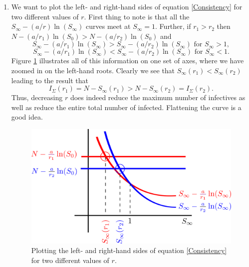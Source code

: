 \documentclass[10pt]{article}
\newcommand{\bb}{\begin{equation}}
\newcommand{\ee}{\end{equation}}
\newcommand{\fig}[1]{Figure \ref{#1}}
\newcommand{\eqn}[1]{equation \eqref{#1}}
\newcommand{\tp}{.8\textwidth}
\renewcommand{\l}{\left(}
\renewcommand{\r}{\right)}
\begin{document}
\begin{Answ}
\begin{enumerate}
\item We want to plot the left- and right-hand sides of \eqn{Consistency} for two different values of $r$. First thing to note is that all the $S_\infty-\l a/r\r\ln(S_\infty)$ curves meet at $S_\infty=1$. Further, if $r_1>r_2$ then $N-(a/r_1)\ln(S_0)>N-(a/r_2)\ln(S_0)$ and 
\bb
S_\infty-\l a/r_1\r\ln(S_\infty)>S_\infty-\l a/r_2\r\ln(S_\infty) \textrm{ for } S_\infty>1,
\ee
\bb
S_\infty-\l a/r_1\r\ln(S_\infty)<S_\infty-\l a/r_2\r\ln(S_\infty) \textrm{ for }S_\infty<1.
\ee
\fig{Flatten} illustrates all of this information on one set of axes, where we have zoomed in on the left-hand roots. Clearly we see that $S_\infty(r_1)<S_\infty(r_2)$ leading to the result that
\bb
I_{\Sigma}(r_1)=N-S_\infty(r_1)>N-S_\infty(r_2)=I_{\Sigma}(r_2).
\ee
Thus, decreasing $r$ does indeed reduce the maximum number of infectives as well as reduce the entire total number of infected. Flattening the curve is a good idea.
\begin{figure}[h!!!tb]
\centering
\includegraphics[width=\tp]{../../Pictures/Flatten_the_curve.png}
\caption{\label{Flatten} Plotting the left- and right-hand sides of \eqn{Consistency} for two different values of $r$.}
\end{figure}
\end{enumerate}
\end{Answ}
\end{document}

